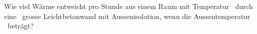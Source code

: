 Wie viel Wärme entweicht pro Stunde aus einem Raum mit Temperatur \tiO\ durch eine \AwO\ grosse Leichtbetonwand mit Aussenisolation, wenn die Aussentemperatur \taO\ beträgt?
